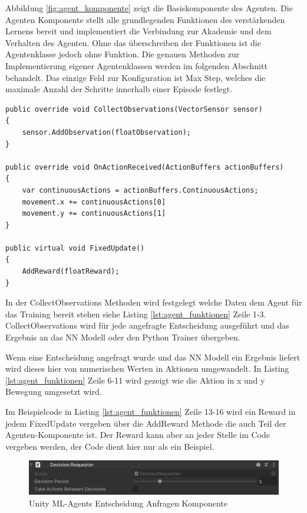 Abbildung \ref{fig:agent_komponente} zeigt die Basiskomponente des Agenten. Die Agenten Komponente stellt alle grundlegenden Funktionen des verstärkenden Lernens bereit und implementiert die Verbindung zur Akademie und dem Verhalten des Agenten. Ohne das überschreiben der Funktionen ist die Agentenklasse jedoch ohne Funktion. Die genauen Methoden zur Implementierung eigener Agentenklassen werden im folgenden Abschnitt behandelt. Das einzige Feld zur Konfiguration ist Max Step, welches die maximale Anzahl der Schritte innerhalb einer Episode festlegt.

\begin{lstlisting}[caption={Agent Funktionen},captionpos=b,label={lst:agent_funktionen}]
public override void CollectObservations(VectorSensor sensor)
{
    sensor.AddObservation(floatObservation);
}

public override void OnActionReceived(ActionBuffers actionBuffers)
{
    var continuousActions = actionBuffers.ContinuousActions;
    movement.x += continuousActions[0]
    movement.y += continuousActions[1]
}

public virtual void FixedUpdate()
{
    AddReward(floatReward);
}
\end{lstlisting}

In der CollectObservations Methoden wird festgelegt welche Daten dem Agent für das Training bereit stehen siehe Listing \ref{lst:agent_funktionen} Zeile 1-3. CollectObservations wird für jede angefragte Entscheidung ausgeführt und das Ergebnis an das NN Modell oder den Python Trainer übergeben.

Wenn eine Entscheidung angefragt wurde und das NN Modell ein Ergebnis liefert wird dieses hier von numerischen Werten in Aktionen umgewandelt. In Listing \ref{lst:agent_funktionen} Zeile 6-11 wird gezeigt wie die Aktion in x und y Bewegung umgesetzt wird.

Im Beispielcode in Listing \ref{lst:agent_funktionen} Zeile 13-16 wird ein Reward in jedem FixedUpdate vergeben über die AddReward Methode die auch Teil der Agenten-Komponente ist. Der Reward kann aber an jeder Stelle im Code vergeben werden, der Code dient hier nur als ein Beispiel.

\begin{figure}[H]
  \centering  
  \includegraphics[scale=0.5]{img/entscheidung_anfragen_komponente.png}
  \caption{Unity ML-Agents Entscheidung Anfragen Komponente}
  \label{fig:entscheidung_anfragen_komponente}
\end{figure}

